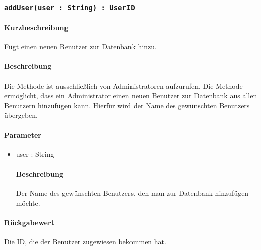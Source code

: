 \subsubsection{\texttt{addUser(user : String) : UserID}}%
\paragraph*{Kurzbeschreibung}
Fügt einen neuen Benutzer zur Datenbank hinzu.
\paragraph*{Beschreibung}
Die Methode ist ausschließlich von Administratoren aufzurufen.
Die Methode ermöglicht, dass ein Administrator einen neuen Benutzer zur Datenbank aus allen Benutzern hinzufügen kann.
Hierfür wird der Name des gewünschten Benutzers übergeben.
\paragraph*{Parameter}
\begin{itemize}
    \item user : String
    		\paragraph*{Beschreibung}
    		Der Name des gewünschten Benutzers, den man zur Datenbank hinzufügen möchte.
\end{itemize}
\paragraph*{Rückgabewert}
Die ID, die der Benutzer zugewiesen bekommen hat.
